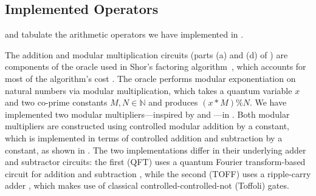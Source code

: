 \subsection{Implemented Operators}

 and  tabulate the
arithmetic operators we have implemented in \vqir. 

The addition and modular multiplication circuits 
(parts (a) and (d) of ) are components of the oracle used in Shor's factoring algorithm~\cite{shors}, which accounts for most of the algorithm's cost \cite{Gidney2021howtofactorbit}.
The oracle performs modular exponentiation on natural numbers via modular multiplication, which takes a quantum variable $x$ and two co-prime constants $M, N \in \mathbb{N}$ and produces $(x * M) \% N$. We have implemented two modular multipliers---inspired by \citet{qft-adder}
and \citet{ripple-carry-mod}---in \vqir. 
Both modular multipliers are constructed using controlled modular addition by a constant, which is implemented in terms of controlled addition and subtraction by a constant, as shown in .
The two implementations differ in their underlying adder and subtractor circuits: the first (QFT) uses a quantum Fourier transform-based circuit for addition and subtraction \cite{Draper2000AdditionOA}, while the second (TOFF) uses a ripple-carry adder \cite{ripple-carry-mod}, which makes use of classical controlled-controlled-not (Toffoli) gates.


